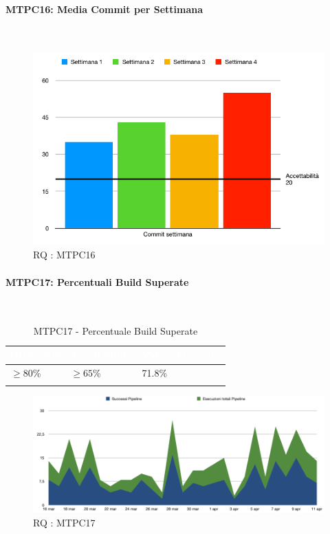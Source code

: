 \paragraph{MTPC16: Media Commit per Settimana}\-\\
\begin{figure}[H]
	\begin{center}
		\includegraphics[scale=0.5]{./images/grafici_RQ/commitSettimana.png} 
	\end{center}
	\caption{RQ : MTPC16}
\end{figure}

\paragraph{MTPC17: Percentuali Build Superate}\-\\

\begin{longtable}{|C{.15\textwidth}|C{.24\textwidth}|C{.24\textwidth}|}
	\hline
	\textbf{\textcolor{white}{Ottimalità}} & \textbf{\textcolor{white}{Accettabilità}} & \textbf{\textcolor{white}{Valore Misurato}} \\
	\hline \hline
	\endhead
	$\geq 80$\% & $\geq 65$\% & 71.8\% \\
	\hline
	\caption{MTPC17 - Percentuale Build Superate}
	\label{mtpc17}
\end{longtable}
\begin{figure}[H]
	\begin{center}
		\includegraphics[scale=0.5]{./images/grafici_RQ/pipeline.png} 
	\end{center}
	\caption{RQ : MTPC17}
\end{figure}

